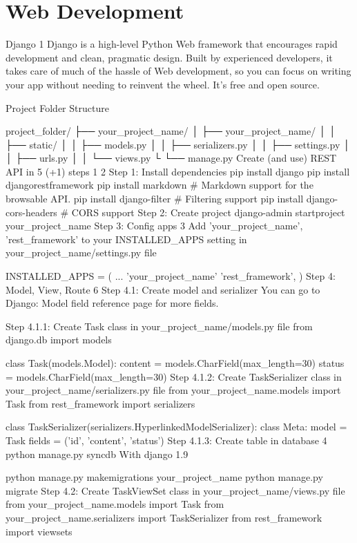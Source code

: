 \section{Web Development}

Django 1
Django is a high-level Python Web framework that encourages rapid development and clean, pragmatic design. Built by experienced developers, it takes care of much of the hassle of Web development, so you can focus on writing your app without needing to reinvent the wheel. It’s free and open source.

Project Folder Structure

project_folder/
├── your_project_name/
│   ├── your_project_name/
│   │   ├── static/
│   │   ├── models.py
│   │   ├── serializers.py
│   │   ├── settings.py
│   │   ├── urls.py
│   │   └── views.py
└   └── manage.py
Create (and use) REST API in 5 (+1) steps 1 2
Step 1: Install dependencies
pip install django
pip install djangorestframework
pip install markdown             # Markdown support for the browsable API.
pip install django-filter        # Filtering support
pip install django-cors-headers  # CORS support
Step 2: Create project
django-admin startproject your_project_name
Step 3: Config apps 3
Add 'your_project_name', 'rest_framework' to your INSTALLED_APPS setting in your_project_name/settings.py file

INSTALLED_APPS = (
    ...
    'your_project_name'
    'rest_framework',
)
Step 4: Model, View, Route 6
Step 4.1: Create model and serializer
You can go to Django: Model field reference page for more fields.

Step 4.1.1: Create Task class in your_project_name/models.py file
from django.db import models

class Task(models.Model):
    content = models.CharField(max_length=30)
    status = models.CharField(max_length=30)
Step 4.1.2: Create TaskSerializer class in your_project_name/serializers.py file
from your_project_name.models import Task
from rest_framework import serializers

class TaskSerializer(serializers.HyperlinkedModelSerializer):
    class Meta:
        model = Task
        fields = ('id', 'content', 'status')
Step 4.1.3: Create table in database 4
python manage.py syncdb
With django 1.9

python manage.py makemigrations your_project_name
python manage.py migrate
Step 4.2: Create TaskViewSet class in your_project_name/views.py file
from your_project_name.models import Task
from your_project_name.serializers import TaskSerializer
from rest_framework import viewsets

